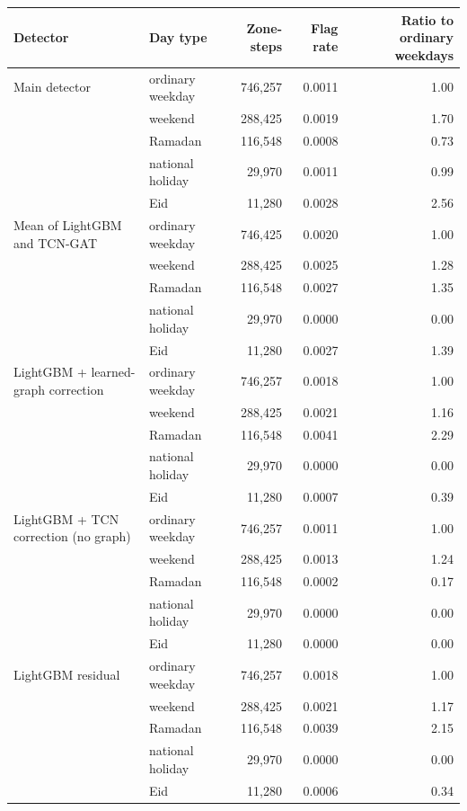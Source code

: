\documentclass[11pt,a4paper]{article}
\makeatletter
\newenvironment{stable}{\par\addvspace{8pt}\noindent\begin{minipage}{\textwidth}\def\@captype{table}\centering}{\end{minipage}\par\addvspace{8pt}}
\makeatother
\begin{document}
\begin{stable}
\caption{Alarms of the detectors alone on the real southern data by day type: the share of rule-negative zone-steps (no rule state of the zone within $\pm$53 steps) whose score exceeds the detector's threshold, and its ratio to the rate on ordinary weekdays. Day types are exclusive, in the order Eid, national holiday, Ramadan, weekend.}\label{tab:s-hard-negatives}
\scriptsize\setlength{\tabcolsep}{4pt}
\begin{tabular}{@{}l l r r r@{}}
\toprule
Detector & Day type & Zone-steps & Flag rate & Ratio to ordinary weekdays \\
\midrule
Main detector & ordinary weekday & 746,257 & 0.0011 & 1.00 \\
 & weekend & 288,425 & 0.0019 & 1.70 \\
 & Ramadan & 116,548 & 0.0008 & 0.73 \\
 & national holiday & 29,970 & 0.0011 & 0.99 \\
 & Eid & 11,280 & 0.0028 & 2.56 \\
\midrule
Mean of LightGBM and TCN-GAT & ordinary weekday & 746,425 & 0.0020 & 1.00 \\
 & weekend & 288,425 & 0.0025 & 1.28 \\
 & Ramadan & 116,548 & 0.0027 & 1.35 \\
 & national holiday & 29,970 & 0.0000 & 0.00 \\
 & Eid & 11,280 & 0.0027 & 1.39 \\
\midrule
LightGBM + learned-graph correction & ordinary weekday & 746,257 & 0.0018 & 1.00 \\
 & weekend & 288,425 & 0.0021 & 1.16 \\
 & Ramadan & 116,548 & 0.0041 & 2.29 \\
 & national holiday & 29,970 & 0.0000 & 0.00 \\
 & Eid & 11,280 & 0.0007 & 0.39 \\
\midrule
LightGBM + TCN correction (no graph) & ordinary weekday & 746,257 & 0.0011 & 1.00 \\
 & weekend & 288,425 & 0.0013 & 1.24 \\
 & Ramadan & 116,548 & 0.0002 & 0.17 \\
 & national holiday & 29,970 & 0.0000 & 0.00 \\
 & Eid & 11,280 & 0.0000 & 0.00 \\
\midrule
LightGBM residual & ordinary weekday & 746,257 & 0.0018 & 1.00 \\
 & weekend & 288,425 & 0.0021 & 1.17 \\
 & Ramadan & 116,548 & 0.0039 & 2.15 \\
 & national holiday & 29,970 & 0.0000 & 0.00 \\
 & Eid & 11,280 & 0.0006 & 0.34 \\
\bottomrule
\end{tabular}
\end{stable}
\end{document}
